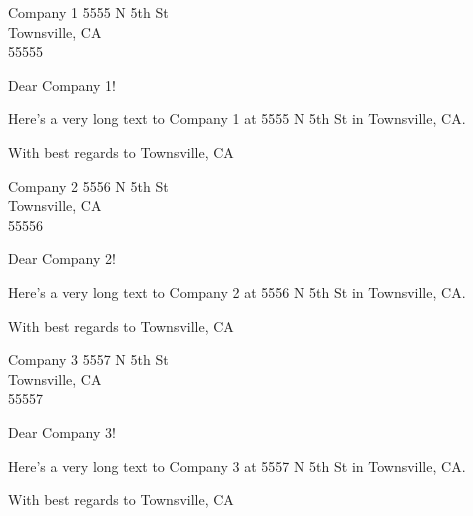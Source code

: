 \documentclass[11pt]{letter}
\begin{document}
\newcommand\writeletter[4]{
    \begin{letter}{#1 #2\\#3\\#4}
        \opening{Dear #1!}
        Here's a very long text to #1 at #2 in #3.
        \closing{With best regards to #3}
    \end{letter}
}

\writeletter{Company 1}{5555 N 5th St}{Townsville, CA}{55555}
\writeletter{Company 2}{5556 N 5th St}{Townsville, CA}{55556}
\writeletter{Company 3}{5557 N 5th St}{Townsville, CA}{55557}
\end{document}
